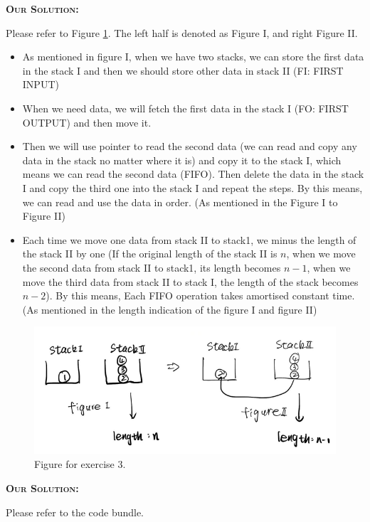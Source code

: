 \documentclass{exam}
\renewenvironment{solution}{\textsc{\textbf{Our Solution:}} \par}{}
\begin{document}
\begin{questions}
	\question
	\begin{solution}
		Please refer to Figure \ref{fig_ex3}. The left half is denoted as Figure I, and right Figure II.
		\begin{itemize}
			\item As mentioned in figure I, when we have two stacks, we can store the first data in the stack I and then we should store other data in stack II (FI: FIRST INPUT)
			\item When we need data, we will fetch the first data in the stack I (FO: FIRST OUTPUT) and then move it.
			\item Then we will use pointer to read the second data (we can read and copy any data in the stack no matter where it is) and copy it to the stack I, which means we can read the second data (FIFO). Then delete the data in the stack I and copy the third one into the stack I and repeat the steps. By this means, we can read and use the data in order. (As mentioned in the Figure I to Figure II)
			\item Each time we move one data from stack II to stack1, we minus the length of the stack II by one (If the original length of the stack II is $n$, when we move the second data from stack II to stack1, its length becomes $n-1$, when we move the third data from stack II to stack I, the length of the stack becomes $n-2$). By this means, Each FIFO operation takes amortised constant time. (As mentioned in the length indication of the figure I and figure II)
		\end{itemize}
		\begin{figure}
			\centering
			\includegraphics[width=16cm]{fig_ex3.png}
			\caption{Figure for exercise 3.}
			\label{fig_ex3}
		\end{figure}
	\end{solution}



	\question
	\begin{solution}
		Please refer to the code bundle.
	\end{solution}
\end{questions}
\end{document}
